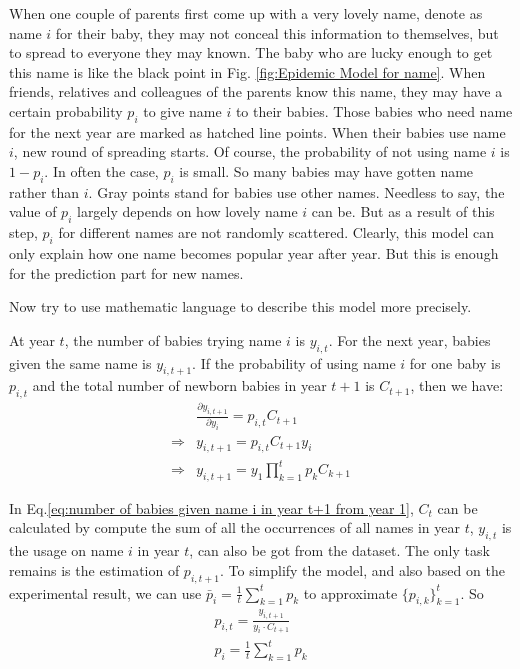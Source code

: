 \documentclass[journal]{IEEEtran}
\begin{document}
When one couple of parents first come up with a very lovely name, denote as name $i$ for their baby, they may not conceal this information to themselves, but to spread to everyone they may known. The baby who are lucky enough to get this name is like the black point in Fig. \ref{fig:Epidemic Model for name}. When friends, relatives and colleagues of the parents know this name, they may have a certain probability $p_i$ to give name $i$ to their babies. Those babies who need name for the next year are marked as hatched line points. When their babies use name $i$, new round of spreading starts. Of course, the probability of not using name $i$ is $1 - p_i$. In often the case, $p_i$ is small. So many babies may have gotten name rather than $i$. Gray points stand for babies use other names. Needless to say, the value of $p_i$ largely depends on how lovely name $i$ can be. But as a result of this step, $p_i$ for different names are not randomly scattered. Clearly, this model can only explain how one name becomes popular year after year. But this is enough for the prediction part for new names.

Now try to use mathematic language to describe this model more precisely.

At year $t$, the number of babies trying name $i$ is $y_{i, t}$. For the next year, babies given the same name is $y_{i, t + 1}$. If the probability of using name $i$ for one baby is $p_{i, t}$ and the total number of newborn babies in year $t + 1$ is $C_{t + 1}$, then we have:
\begin{align}
		& \frac{\partial y_{i, t + 1}}{\partial y_{i}} = p_{i, t} C_{t + 1}\\
	\Rightarrow &
		y_{i, t + 1} = p_{i, t} C_{t + 1} y_{i}\\
	\Rightarrow & 
		y_{i, t + 1} = y_{1}\prod_{k = 1}^t p_{k} C_{k + 1} \label{eq:number of babies given name i in year t+1 from year 1}
\end{align}

In Eq.\ref{eq:number of babies given name i in year t+1 from year 1}, $C_{t}$ can be calculated by compute the sum of all the occurrences of all names in year $t$, $y_{i, t}$ is the usage on name $i$ in year $t$, can also be got from the dataset. The only task remains is the estimation of $p_{i, t + 1}$. To simplify the model, and also based on the experimental result, we can use $\bar p_{i} = \frac{1}{t}\sum_{k = 1}^t p_{k}$ to approximate $\{p_{i, k}\}_{k = 1}^t$.
So 
\begin{align}
	p_{i, t} = \frac{y_{i, t + 1}}{y_{i} \cdot C_{t + 1}} \\
	p_i = \frac{1}{t}\sum_{k = 1}^t p_{k}
\end{align}
\end{document}
